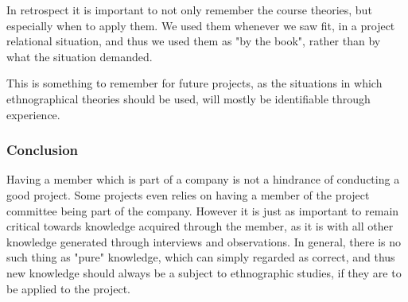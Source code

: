 In retrospect it is important to not only remember the course theories, but especially when to apply them. We used them whenever we saw fit, in a project relational situation, and thus we used them as "by the book", rather than by what the situation demanded.

This is something to remember for future projects, as the situations in which ethnographical theories should be used, will mostly be identifiable through experience.

\subsubsection{Conclusion}

Having a member which is part of a company is not a hindrance of conducting a good project. Some projects even relies on having a member of the project committee being part of the company.
However it is just as important to remain critical towards knowledge acquired through the member, as it is with all other knowledge generated through interviews and observations.
In general, there is no such thing as "pure" knowledge, which can simply regarded as correct, and thus new knowledge should always be a subject to ethnographic studies, if they are to be applied to the project.

